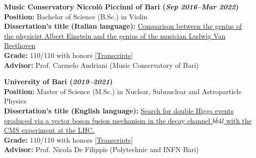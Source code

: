 \documentclass[11pt]{res}
\begin{document}
\begin{resume}
\textbf{Music Conservatory Niccolò Piccinni of Bari (\textit{Sep 2016--Mar 2022})}\\
\textbf{Position:} Bachelor of Science (B.Sc.) in Violin\\
\textbf{Dissertation's title (Italian language):}
\href{https://drive.google.com/file/d/1D4PbAL-X92U5CsQO8JGemSHA03GEtdu0/view?usp=share_link}{Comparison between the genius of the physicist Albert Einstein and the genius of the musician Ludwig Van Beethoven}\\
\textbf{Grade:} 110/110 with honors [\href{https://drive.google.com/file/d/1aV1ERPqgSpQ-9SRbWIpw-Q4BkuS1kvyy/view?usp=share_link}{Transcripts}]\\
\textbf{Advisor:} Prof. Carmelo Andriani (Music Conservatory of Bari)

\textbf{University of Bari (\textit{2019--2021})}\\
\textbf{Position:} Master of Science (M.Sc.) in Nuclear, Subnuclear and Astroparticle Physics\\
\textbf{Dissertation's title (English language):}
\href{https://inspirehep.net/literature/1955669}{Search for double Higgs events produced via a vector boson fusion mechanism in the decay channel $b\overline{b}4l$ with the CMS experiment at the LHC.}\\
\textbf{Grade:} 110/110 with honors [\href{https://drive.google.com/file/d/1V2sxudg9bGwW-S0WduNndtO60tdJLPUf/view?usp=sharing}{Transcripts}]\\
\textbf{Advisor:} Prof. Nicola De Filippis (Polytechnic and INFN Bari)


\end{resume}
\end{document}
